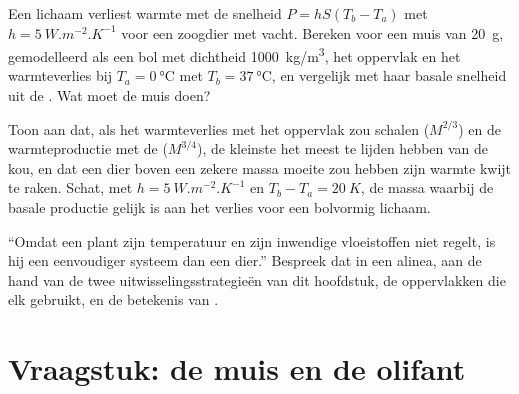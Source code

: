 \begin{exercise}[$\star\star\star$]\label{exo:b1:organism-environment:10}
Een lichaam verliest warmte met de snelheid $P = hS(T_b - T_a)$ met
$h = \qty{5}{W.m^{-2}.K^{-1}}$ voor een zoogdier met vacht. Bereken voor een
muis van \qty{20}{g}, gemodelleerd als een bol met dichtheid
\qty{1000}{kg/m^3}, het oppervlak en het warmteverlies bij
$T_a = \qty{0}{\celsius}$ met $T_b =
\qty{37}{\celsius}$, en vergelijk met haar basale snelheid uit de . Wat moet de muis doen?
\end{exercise}

\begin{exercise}[$\star\star\star$]\label{exo:b1:organism-environment:11}
Toon aan dat, als het warmteverlies met het oppervlak zou schalen ($M^{2/3}$)
en de warmteproductie met de  ($M^{3/4}$), de kleinste
 het meest te lijden hebben van de kou, en dat een dier boven een
zekere massa moeite zou hebben zijn warmte kwijt te raken. Schat, met
$h = \qty{5}{W.m^{-2}.K^{-1}}$ en $T_b - T_a = \qty{20}{K}$, de massa waarbij
de basale productie gelijk is aan het verlies voor een bolvormig lichaam.
\end{exercise}

\begin{exercise}[$\star\star\star$]\label{exo:b1:organism-environment:12}
``Omdat een plant zijn temperatuur en zijn inwendige vloeistoffen niet regelt,
is hij een eenvoudiger systeem dan een dier.'' Bespreek dat in een alinea, aan
de hand van de twee uitwisselingsstrategieën van dit hoofdstuk, de oppervlakken
die elk gebruikt, en de betekenis van .
\end{exercise}

\section{Vraagstuk: de muis en de olifant}


